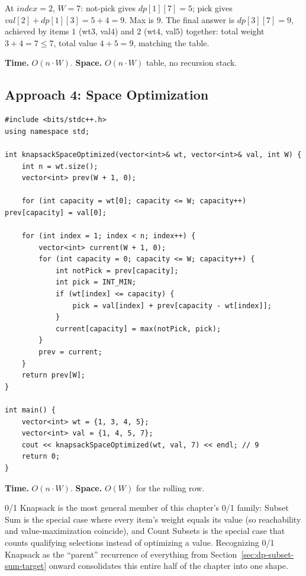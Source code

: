 At $\textit{index}=2$, $W=7$: not-pick gives $\textit{dp}[1][7]=5$; pick
gives $\textit{val}[2]+\textit{dp}[1][3] = 5+4=9$. Max is $9$. The final
answer is $\textit{dp}[3][7]=9$, achieved by items $1$ (wt$3$, val$4$)
and $2$ (wt$4$, val$5$) together: total weight $3+4=7\le7$, total value
$4+5=9$, matching the table.

\begin{complexitybox}
\textbf{Time.} $O(n \cdot W)$.
\textbf{Space.} $O(n \cdot W)$ table, no recursion stack.
\end{complexitybox}

\subsection*{Approach 4: Space Optimization}

\begin{lstlisting}
#include <bits/stdc++.h>
using namespace std;

int knapsackSpaceOptimized(vector<int>& wt, vector<int>& val, int W) {
    int n = wt.size();
    vector<int> prev(W + 1, 0);

    for (int capacity = wt[0]; capacity <= W; capacity++) prev[capacity] = val[0];

    for (int index = 1; index < n; index++) {
        vector<int> current(W + 1, 0);
        for (int capacity = 0; capacity <= W; capacity++) {
            int notPick = prev[capacity];
            int pick = INT_MIN;
            if (wt[index] <= capacity) {
                pick = val[index] + prev[capacity - wt[index]];
            }
            current[capacity] = max(notPick, pick);
        }
        prev = current;
    }
    return prev[W];
}

int main() {
    vector<int> wt = {1, 3, 4, 5};
    vector<int> val = {1, 4, 5, 7};
    cout << knapsackSpaceOptimized(wt, val, 7) << endl; // 9
    return 0;
}
\end{lstlisting}

\begin{complexitybox}
\textbf{Time.} $O(n \cdot W)$.
\textbf{Space.} $O(W)$ for the rolling row.
\end{complexitybox}

\begin{takeawaybox}
0/1 Knapsack is the most general member of this chapter's 0/1 family:
Subset Sum is the special case where every item's weight equals its
value (so reachability and value-maximization coincide), and Count
Subsets is the special case that counts qualifying selections instead of
optimizing a value. Recognizing 0/1 Knapsack as the ``parent'' recurrence
of everything from Section~\ref{sec:dp-subset-sum-target} onward
consolidates this entire half of the chapter into one shape.
\end{takeawaybox}

